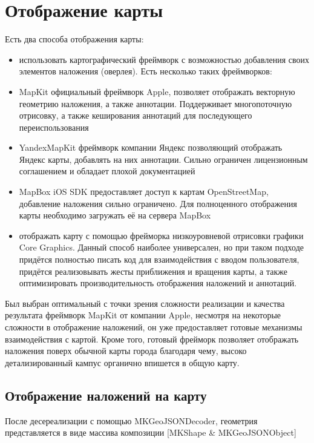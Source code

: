   \section{Отображение карты}
    Есть два способа отображения карты:
    \begin{itemize}
      \item использовать картографический фреймворк с возможностью добавления своих элементов наложения (оверлея). Есть несколько таких фреймворков:
      \item MapKit официальный фреймворк Apple, позволяет отображать векторную геометрию наложения, а также аннотации. Поддерживает многопоточную отрисовку, а также кеширования аннотаций для последующего переиспользования
      \item YandexMapKit фреймворк компании Яндекс позволяющий отображать Яндекс карты, добавлять на них аннотации. Сильно ограничен лицензионным соглашением и обладает плохой документацией
      \item MapBox iOS SDK предоставляет доступ к картам OpenStreetMap, добавление наложения сильно ограничено. Для полноценного отображения карты необходимо загружать её на сервера MapBox
      \item отображать карту с помощью фрейморка низкоуровневой отрисовки графики Core Graphics. Данный способ наиболее универсален, но при таком подходе придётся полностью писать код для взаимодействия с вводом пользователя, придётся реализовывать жесты приближения и вращения карты, а также оптимизировать производительность отображения наложений и аннотаций.
    \end{itemize}


    Был выбран оптимальный с точки зрения сложности реализации и качества результата фреймворк MapKit от компании Apple, несмотря на некоторые сложности в отображение наложений, он уже предоставляет готовые механизмы взаимодействия с картой. Кроме того, готовый фрейморк позволяет отображать наложения поверх обычной карты города благодаря чему, высоко детализированный кампус органично впишется в общую карту.

    \subsection{Отображение наложений на карту}
      После десереализации с помощью MKGeoJSONDecoder, геометрия представляется в виде массива композиции [MKShape \& MKGeoJSONObject]


